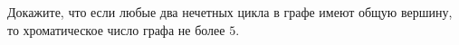 Докажите, что если любые два нечетных цикла в графе имеют общую вершину, то хроматическое число графа не
более $5$.
